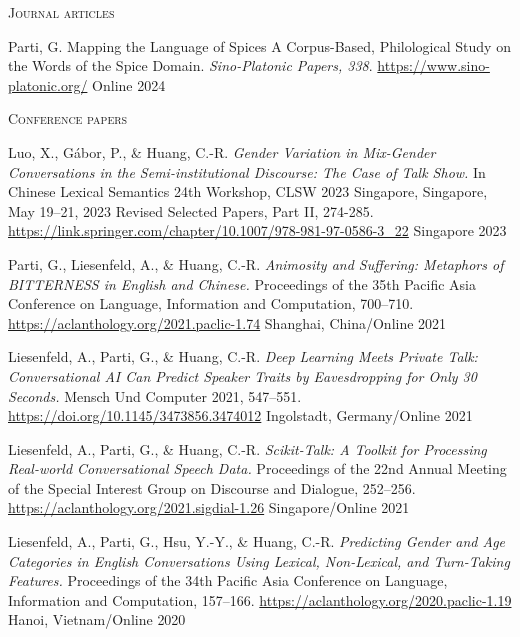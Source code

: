 
\textsc{Journal articles}

\begin{cvhonors}

  \cvhonor
  {Parti, G.} %
  {Mapping the Language of Spices A Corpus-Based, Philological Study on the Words of the Spice Domain. \textit{Sino-Platonic Papers, 338}. \url{https://www.sino-platonic.org/}} %
  {Online} %
  {2024} %

\end{cvhonors}

\textsc{Conference papers}

\begin{cvhonors}

\cvhonor
{Luo, X., Gábor, P., \& Huang, C.-R.} %
{\textit{Gender Variation in Mix-Gender Conversations in the Semi-institutional Discourse: The Case of Talk Show.} In Chinese Lexical Semantics 24th Workshop, CLSW 2023
Singapore, Singapore, May 19–21, 2023 Revised Selected Papers, Part II, 274-285. \url{https://link.springer.com/chapter/10.1007/978-981-97-0586-3_22}} %
{Singapore} %
{2023} %

\cvhonor
{Parti, G., Liesenfeld, A., \& Huang, C.-R.} %
{\textit{Animosity and Suffering: Metaphors of BITTERNESS in English and Chinese.} Proceedings of the 35th Pacific Asia Conference on Language, Information and Computation, 700–710. \url{https://aclanthology.org/2021.paclic-1.74}} %
{Shanghai, China/Online} %
{2021} %

\cvhonor
{Liesenfeld, A., Parti, G., \& Huang, C.-R.} %
{\textit{Deep Learning Meets Private Talk: Conversational AI Can Predict Speaker Traits by Eavesdropping for Only 30 Seconds.} Mensch Und Computer 2021, 547–551. \url{https://doi.org/10.1145/3473856.3474012}} %
{Ingolstadt, Germany/Online} %
{2021} %

\cvhonor
{Liesenfeld, A., Parti, G., \& Huang, C.-R.} %
{\textit{Scikit-Talk: A Toolkit for Processing Real-world Conversational Speech Data.} Proceedings of the 22nd Annual Meeting of the Special Interest Group on Discourse and Dialogue, 252–256. \url{https://aclanthology.org/2021.sigdial-1.26}} %
{Singapore/Online} %
{2021} %

\cvhonor
{Liesenfeld, A., Parti, G., Hsu, Y.-Y., \& Huang, C.-R.} %
{\textit{Predicting Gender and Age Categories in English Conversations Using Lexical, Non-Lexical, and Turn-Taking Features.} Proceedings of the 34th Pacific Asia Conference on Language, Information and Computation, 157–166. \url{https://aclanthology.org/2020.paclic-1.19}} %
{Hanoi, Vietnam/Online} %
{2020} %

\end{cvhonors}

